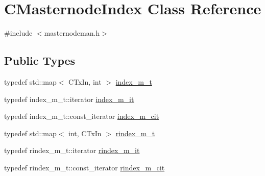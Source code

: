 \hypertarget{class_c_masternode_index}{}\section{C\+Masternode\+Index Class Reference}
\label{class_c_masternode_index}


{\ttfamily \#include $<$masternodeman.\+h$>$}

\subsection*{Public Types}
\begin{DoxyCompactItemize}
\item 
typedef std\+::map$<$ C\+Tx\+In, int $>$ \mbox{\hyperlink{class_c_masternode_index_a78c666dcc663fceff46cd86f4eb1870c}{index\+\_\+m\+\_\+t}}
\item 
typedef index\+\_\+m\+\_\+t\+::iterator \mbox{\hyperlink{class_c_masternode_index_a5a09121c16d5c51ab422b2d2f02a2d6b}{index\+\_\+m\+\_\+it}}
\item 
typedef index\+\_\+m\+\_\+t\+::const\+\_\+iterator \mbox{\hyperlink{class_c_masternode_index_a012060326cfe73f675a791131b6fd91a}{index\+\_\+m\+\_\+cit}}
\item 
typedef std\+::map$<$ int, C\+Tx\+In $>$ \mbox{\hyperlink{class_c_masternode_index_ad04aa24155d452c5c222562c0f3c3e21}{rindex\+\_\+m\+\_\+t}}
\item 
typedef rindex\+\_\+m\+\_\+t\+::iterator \mbox{\hyperlink{class_c_masternode_index_a40bf06eaf7389e6017bf87c488ea9aea}{rindex\+\_\+m\+\_\+it}}
\item 
typedef rindex\+\_\+m\+\_\+t\+::const\+\_\+iterator \mbox{\hyperlink{class_c_masternode_index_ac24d75bd8a5832de19ba5ae8f37e9e90}{rindex\+\_\+m\+\_\+cit}}
\end{DoxyCompactItemize}
